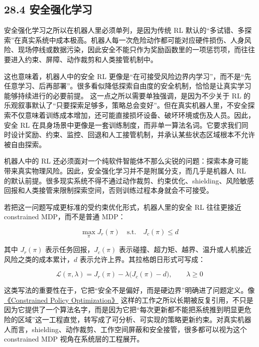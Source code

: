 \subsection*{28.4 安全强化学习}


安全强化学习之所以在机器人里必须单列，是因为传统 RL 默认的“多试错、多探索”在真实系统中成本极高。机器人每一次危险动作都可能对应硬件损伤、人身风险、现场停线或数据污染，因此安全不能只作为奖励函数里的一项惩罚项，而往往要进入约束、屏障、动作裁剪和人类接管机制中。

这也意味着，机器人中的安全 RL 更像是“在可接受风险边界内学习”，而不是“先任意学习、后再部署”。很多看似降低探索自由度的安全机制，恰恰是让真实学习能够持续进行的必要前提。 这一点之所以需要单独强调，是因为不少关于 RL 的乐观叙事默认了“只要探索足够多，策略总会变好”。但在真实机器人里，不安全探索不仅意味着训练成本增加，还可能直接损坏设备、破坏环境或伤及人员。因此，安全 RL 在具身场景中更像是一套训练制度，而非单一算法名词。它要求我们同时设计奖励、约束、监控、回退和人工接管机制，并承认某些状态区域根本不允许被自由探索。

机器人中的 RL 还必须面对一个纯软件智能体不那么尖锐的问题：探索本身可能带来真实物理风险。因此，安全强化学习并不是附属分支，而几乎是机器人 RL 的默认前提。很多现实系统不得不通过动作裁剪、约束优化、shielding、风险敏感回报和人类接管来限制探索空间，否则训练过程本身就会不可接受。

若把这一问题写成更标准的受约束优化形式，机器人里的安全 RL 往往更接近 constrained MDP，而不是普通 MDP：

\begingroup
\footnotesize
\begin{equation*}
\max_{\pi} J_r(\pi)
\quad \text{s.t.} \quad
J_c(\pi) \le d
\end{equation*}
\endgroup

其中 \(J_r(\pi)\) 表示任务回报，\(J_c(\pi)\) 表示碰撞、超力矩、越界、温升或人机接近风险之类的成本累计，\(d\) 表示允许上界。其拉格朗日形式可写成：

\begingroup
\footnotesize
\begin{equation*}
\mathcal{L}(\pi,\lambda)=J_r(\pi)-\lambda\bigl(J_c(\pi)-d\bigr), \qquad \lambda \ge 0
\end{equation*}
\endgroup

这类写法的重要性在于，它把“安全不是偏好，而是硬边界”明确进了问题定义。像 \href{https://arxiv.org/abs/1705.10528}{《Constrained Policy Optimization》} 这样的工作之所以长期被反复引用，不只是因为它提供了一个算法名字，而是因为它把“每次更新都不能把系统推到明显更危险的区域”这一工程直觉，转写成了可分析、可实现的策略更新约束。对真实机器人而言，shielding、动作裁剪、工作空间屏蔽和安全接管，很多都可以视为这个 constrained MDP 视角在系统层的工程展开。

